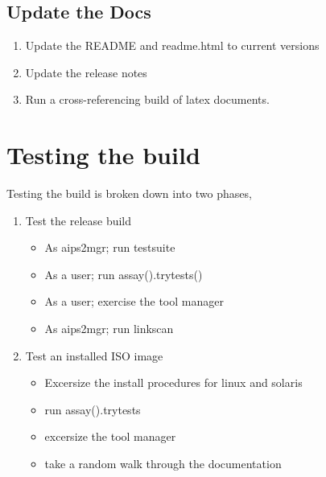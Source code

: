 \subsection{Update the Docs}

\begin{enumerate}
\item Update the README and readme.html to current versions
\item Update the release notes
\item Run a cross-referencing build of latex documents.
\end{enumerate}
\section{Testing the build}
Testing the build is broken down into two phases,
\begin{enumerate}
\item Test the release build
\begin{itemize}
\item As aips2mgr;  run testsuite
\item As a user; run assay().trytests()
\item As a user; exercise the tool manager
\item As aips2mgr; run linkscan
\end{itemize}
\item Test an installed ISO image
\begin{itemize}
\item Excersize the install procedures for linux and solaris
\item run assay().trytests
\item excersize the tool manager
\item take a random walk through the documentation
\end{itemize}
\end{enumerate}
